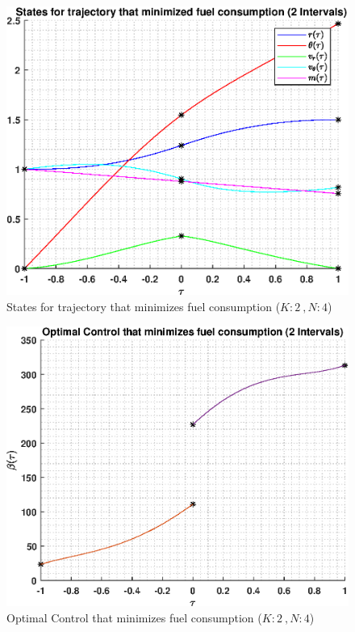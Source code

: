 \documentclass[]{article}
\begin{document}
\begin{figure}
	\centering
	\includegraphics[scale=0.75]{directStatesK2Poly4.eps}
	\caption{States for trajectory that minimizes fuel consumption (\(K:2\ , N:4\))}
	\label{fig:directStatesK2Poly4}
\end{figure}
\begin{figure}
	\centering
	\includegraphics[scale=0.75]{directControlK2Poly4.eps}
	\caption{Optimal Control that minimizes fuel consumption (\(K:2\ , N:4\))}
	\label{fig:directControlK2Poly4}
\end{figure}
\end{document}
